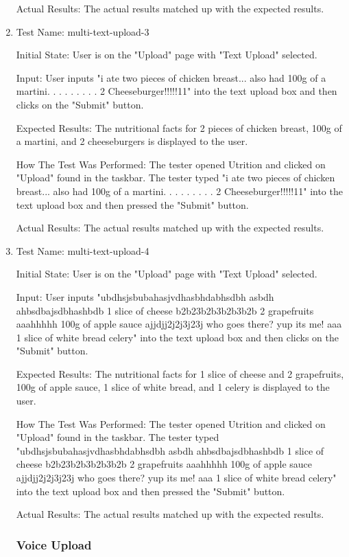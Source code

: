 \documentclass[12pt, titlepage]{article}
\begin{document}
\begin{enumerate}
		Actual Results: The actual results matched up with the expected results.
		
		\item{Test Name: multi-text-upload-3}
		
		Initial State: User is on the "Upload" page with "Text Upload" selected.
		
		Input: User inputs "i ate two pieces of chicken breast... also had 100g of a martini. . . . . . . . . 2 Cheeseburger!!!!!11" into the text upload box and then clicks on the "Submit" button.
		
		Expected Results: The nutritional facts for 2 pieces of chicken breast, 100g of a martini, and 2 cheeseburgers is displayed to the user.
		
		How The Test Was Performed: The tester opened Utrition and clicked on "Upload" found in the taskbar. The tester typed "i ate two pieces of chicken breast... also had 100g of a martini. . . . . . . . . 2 Cheeseburger!!!!!11" into the text upload box and then pressed the "Submit" button.
		
		Actual Results: The actual results matched up with the expected results.
		
		\item{Test Name: multi-text-upload-4}
		
		Initial State: User is on the "Upload" page with "Text Upload" selected.
		
		Input: User inputs "ubdhsjsbubahasjvdhasbhdabhsdbh asbdh ahbsdbajsdbhashbdb 1 slice of cheese b2b23b2b3b2b3b2b 2 grapefruits aaahhhhh 100g of apple sauce ajjdjj2j2j3j23j who goes there? yup its me! aaa 1 slice of white bread celery" into the text upload box and then clicks on the "Submit" button.
		
		Expected Results: The nutritional facts for 1 slice of cheese and 2 grapefruits, 100g of apple sauce, 1 slice of white bread, and 1 celery is displayed to the user.
		
		How The Test Was Performed: The tester opened Utrition and clicked on "Upload" found in the taskbar. The tester typed "ubdhsjsbubahasjvdhasbhdabhsdbh asbdh ahbsdbajsdbhashbdb 1 slice of cheese b2b23b2b3b2b3b2b 2 grapefruits aaahhhhh 100g of apple sauce ajjdjj2j2j3j23j who goes there? yup its me! aaa 1 slice of white bread celery" into the text upload box and then pressed the "Submit" button.
		
		Actual Results: The actual results matched up with the expected results.
	
	
		\subsubsection{Voice Upload}
		

\end{enumerate}
\end{document}
